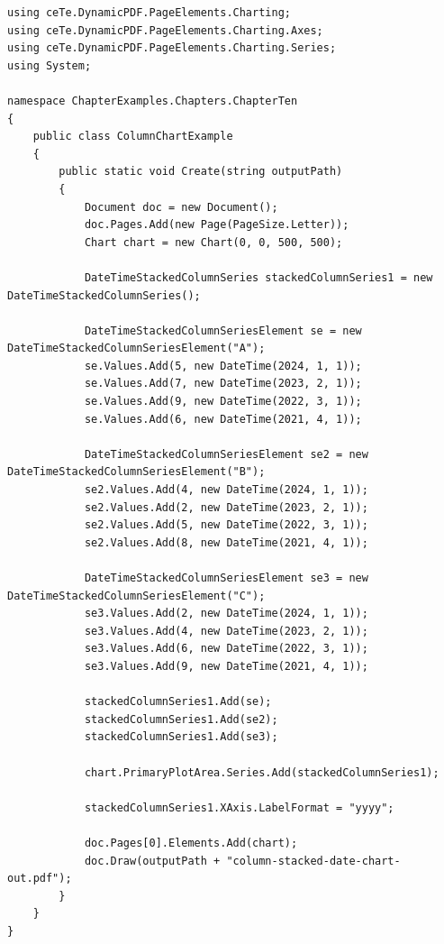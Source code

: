 \documentclass[american]{tufte-book}
\numberwithin{equation}{section}
\numberwithin{figure}{section}
\begin{document}
{\bgroup{}
\begin{lstlisting}[caption={Stacked column chart of indexed data.},label={lis:Stacked-column-chart},basicstyle={\footnotesize\ttfamily},breaklines=true]
using ceTe.DynamicPDF.PageElements.Charting;
using ceTe.DynamicPDF.PageElements.Charting.Axes;
using ceTe.DynamicPDF.PageElements.Charting.Series;
using System;

namespace ChapterExamples.Chapters.ChapterTen
{
    public class ColumnChartExample
    {
        public static void Create(string outputPath)
        {
            Document doc = new Document();
            doc.Pages.Add(new Page(PageSize.Letter));
            Chart chart = new Chart(0, 0, 500, 500);

            DateTimeStackedColumnSeries stackedColumnSeries1 = new DateTimeStackedColumnSeries();

            DateTimeStackedColumnSeriesElement se = new DateTimeStackedColumnSeriesElement("A");
            se.Values.Add(5, new DateTime(2024, 1, 1));
            se.Values.Add(7, new DateTime(2023, 2, 1));
            se.Values.Add(9, new DateTime(2022, 3, 1));
            se.Values.Add(6, new DateTime(2021, 4, 1));

            DateTimeStackedColumnSeriesElement se2 = new DateTimeStackedColumnSeriesElement("B");
            se2.Values.Add(4, new DateTime(2024, 1, 1));
            se2.Values.Add(2, new DateTime(2023, 2, 1));
            se2.Values.Add(5, new DateTime(2022, 3, 1));
            se2.Values.Add(8, new DateTime(2021, 4, 1));

            DateTimeStackedColumnSeriesElement se3 = new DateTimeStackedColumnSeriesElement("C");
            se3.Values.Add(2, new DateTime(2024, 1, 1));
            se3.Values.Add(4, new DateTime(2023, 2, 1));
            se3.Values.Add(6, new DateTime(2022, 3, 1));
            se3.Values.Add(9, new DateTime(2021, 4, 1));

            stackedColumnSeries1.Add(se);
            stackedColumnSeries1.Add(se2);
            stackedColumnSeries1.Add(se3);

            chart.PrimaryPlotArea.Series.Add(stackedColumnSeries1);

            stackedColumnSeries1.XAxis.LabelFormat = "yyyy";

            doc.Pages[0].Elements.Add(chart);
            doc.Draw(outputPath + "column-stacked-date-chart-out.pdf");
        }
    }
}
\end{lstlisting}
\leavevmode\egroup

}
\end{document}
